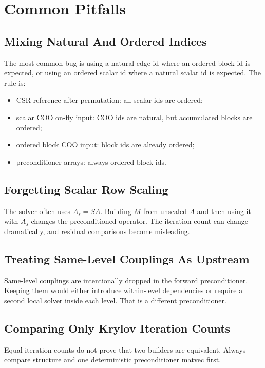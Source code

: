 \documentclass[11pt]{article}
\begin{document}
\section{Common Pitfalls}
\label{sec:pitfalls}

\subsection{Mixing Natural And Ordered Indices}

The most common bug is using a natural edge id where an ordered block id is
expected, or using an ordered scalar id where a natural scalar id is expected.
The rule is:
\begin{itemize}[nosep]
  \item CSR reference after permutation: all scalar ids are ordered;
  \item scalar COO on-fly input: COO ids are natural, but accumulated blocks are
        ordered;
  \item ordered block COO input: block ids are already ordered;
  \item preconditioner arrays: always ordered block ids.
\end{itemize}

\subsection{Forgetting Scalar Row Scaling}

The solver often uses \(A_s=S A\).  Building \(M\) from unscaled \(A\) and then
using it with \(A_s\) changes the preconditioned operator.  The iteration count
can change dramatically, and residual comparisons become misleading.

\subsection{Treating Same-Level Couplings As Upstream}

Same-level couplings are intentionally dropped in the forward preconditioner.
Keeping them would either introduce within-level dependencies or require a
second local solver inside each level.  That is a different preconditioner.

\subsection{Comparing Only Krylov Iteration Counts}

Equal iteration counts do not prove that two builders are equivalent.  Always
compare structure and one deterministic preconditioner matvec first.
\end{document}
